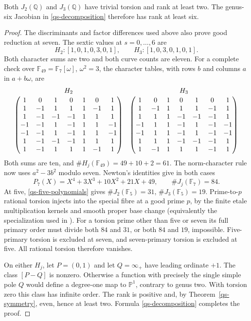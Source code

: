 \begin{theorem}\label{qs-rank-lower}
Both \(J_2(\mathbb Q)\) and \(J_3(\mathbb Q)\) have trivial torsion
and rank at least two. The genus-six Jacobian in
\eqref{qs-decomposition} therefore has rank at least six.
\end{theorem}
\begin{proof}
The discriminants and factor differences used above also prove good
reduction at seven. The sextic values at \(s=0,\ldots,6\) are
\[
 H_2:[1,0,1,0,3,0,1],\qquad H_3:[1,0,3,0,1,0,1].
\]
Both character sums are two and both curve counts are eleven.
For a complete check over \(\mathbb F_{49}=\mathbb F_7[\omega]\),
\(\omega^2=3\), the character tables, with rows \(b\) and columns
\(a\) in \(a+b\omega\), are
\[
\begin{array}{c@{\quad}c}
 H_2&H_3\\[2pt]
 \begin{pmatrix}
 1&0&1&0&1&0&1\\
 1&-1&1&1&1&-1&1\\
 1&-1&-1&-1&1&1&1\\
 -1&-1&1&-1&1&1&-1\\
 -1&-1&1&-1&1&1&-1\\
 1&-1&-1&-1&1&1&1\\
 1&-1&1&1&1&-1&1
 \end{pmatrix}
 &
 \begin{pmatrix}
 1&0&1&0&1&0&1\\
 1&-1&1&1&1&-1&1\\
 1&1&1&-1&-1&-1&1\\
 -1&1&1&-1&1&-1&-1\\
 -1&1&1&-1&1&-1&-1\\
 1&1&1&-1&-1&-1&1\\
 1&-1&1&1&1&-1&1
 \end{pmatrix}
\end{array}
\]
Both sums are ten, and \(\#H_j(\mathbb F_{49})=49+10+2=61\).
The norm-character rule now uses \(a^2-3b^2\) modulo seven. Newton's
identities give in both cases
\[
 P_7(X)=X^4+3X^3+10X^2+21X+49,\qquad \#J_j(\mathbb F_7)=84.
\]
At five, \eqref{qs-five-polynomials} gives
\(\#J_2(\mathbb F_5)=31\), \(\#J_3(\mathbb F_5)=19\).
Prime-to-\(p\) rational torsion injects into the special fibre at a
good prime \(p\), by the finite etale multiplication kernels and
smooth proper base change (equivalently the specialization used in
\cite[IV, Theorem~3.5]{MilneAVQS}). For a torsion prime other than five
or seven its full primary order must divide both \(84\) and \(31\),
or both \(84\) and \(19\), impossible. Five-primary torsion is excluded
at seven, and seven-primary torsion is excluded at five. All rational
torsion therefore vanishes.

On either \(H_j\), let \(P=(0,1)\) and let \(Q=\infty_+\) have
leading ordinate \(+1\). The class \([P-Q]\) is nonzero. Otherwise a
function with precisely the single simple pole \(Q\) would define a
degree-one map to \(\mathbb P^1\), contrary to genus two. With torsion
zero this class has infinite order. The rank is positive and, by
Theorem~\ref{qs-symmetry}, even, hence at least two. Formula
\eqref{qs-decomposition} completes the proof.
\end{proof}

